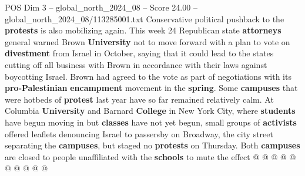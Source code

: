 \begin{textsample}{POS Dim 3 – global\_north\_2024\_08 – Score 24.00 – global\_north\_2024\_08/113285001.txt}
Conservative political pushback to the \textbf{protests} is also mobilizing again.
This week 24 Republican state \textbf{attorneys} general warned Brown \textbf{University} not to move forward with a plan to vote on \textbf{divestment} from Israel in October, saying that it could lead to the states cutting off all business with Brown in accordance with their laws against boycotting Israel.
Brown had agreed to the vote as part of negotiations with its \textbf{pro-Palestinian} \textbf{encampment} movement in the \textbf{spring}.
Some \textbf{campuses} that were hotbeds of \textbf{protest} last year have so far remained relatively calm.
At Columbia \textbf{University} and Barnard \textbf{College} in New York City, where \textbf{students} have begun moving in but \textbf{classes} have not yet begun, small groups of \textbf{activists} offered leaflets denouncing Israel to passersby on Broadway, the city street separating the \textbf{campuses}, but staged no \textbf{protests} on Thursday.
Both \textbf{campuses} are closed to people unaffiliated with the \textbf{schools} to mute the effect @ @ @ @ @ @ @ @ @ @

\end{textsample}
